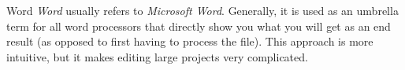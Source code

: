 \begin{definition}{Word} \textit{Word} usually refers to \textit{Microsoft Word}. Generally, it is used as an umbrella term for all word processors that directly show you what you will get as an end result (as opposed to first having to process the file). This approach is more intuitive, but it makes editing large projects very complicated.\end{definition}